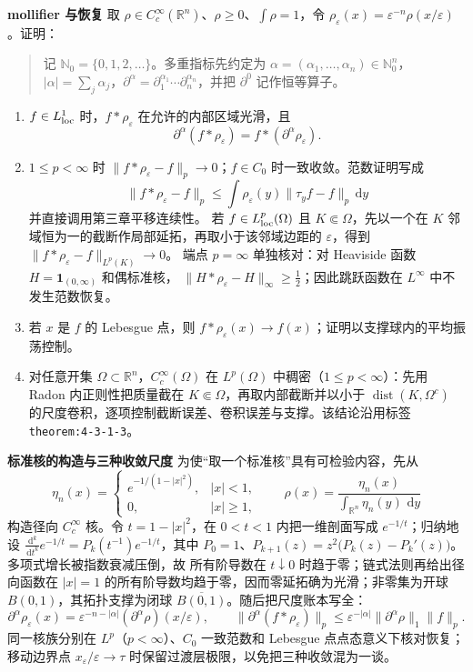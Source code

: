 \documentclass[11pt,a4paper]{ctexart}
\newcommand{\R}{\mathbb R}
\newcommand{\eps}{\varepsilon}
\newcommand{\dd}{\,\mathrm d}
\newcommand{\dist}{\operatorname{dist}}
\newcommand{\planitem}[1]{\par\smallskip\noindent\textcolor{deepblue}{\textbf{#1}}\quad}
\begin{document}
\planitem{mollifier 与恢复}
取 $\rho\in C_c^\infty(\R^n)$、$\rho\ge0$、$\int\rho=1$，令
$\rho_\eps(x)=\eps^{-n}\rho(x/\eps)$。证明：
\begin{quote}
记 $\mathbb N_0=\{0,1,2,\ldots\}$。多重指标先约定为
$\alpha=(\alpha_1,\ldots,\alpha_n)\in\mathbb N_0^n$，
$|\alpha|=\sum_j\alpha_j$，$\partial^\alpha=\partial_1^{\alpha_1}\cdots
\partial_n^{\alpha_n}$，并把 $\partial^0$ 记作恒等算子。
\end{quote}
\begin{enumerate}
\item $f\in L^1_{\rm loc}$ 时，$f*\rho_\eps$ 在允许的内部区域光滑，且
\[
\partial^\alpha(f*\rho_\eps)=f*(\partial^\alpha\rho_\eps).
\]
\item $1\le p<\infty$ 时
$\|f*\rho_\eps-f\|_p\to0$；$f\in C_0$ 时一致收敛。范数证明写成
\[
\|f*\rho_\eps-f\|_p
\le\int\rho_\eps(y)\|\tau_yf-f\|_p\dd y
\]
并直接调用第三章平移连续性。
若 $f\in L^p_{\rm loc}(\Omega)$ 且 $K\Subset\Omega$，先以一个在 $K$ 邻域恒为一的截断作局部延拓，再取小于该邻域边距的 $\eps$，得到
$\|f*\rho_\eps-f\|_{L^p(K)}\to0$。
端点 $p=\infty$ 单独核对：对 Heaviside 函数 $H=\mathbf1_{(0,\infty)}$ 和偶标准核，
$\|H*\rho_\eps-H\|_\infty\ge\tfrac12$；因此跳跃函数在 $L^\infty$ 中不发生范数恢复。
\item 若 $x$ 是 $f$ 的 Lebesgue 点，则 $f*\rho_\eps(x)\to f(x)$；证明以支撑球内的平均振荡控制。
\item 对任意开集 $\Omega\subset\R^n$，$C_c^\infty(\Omega)$ 在 $L^p(\Omega)$ 中稠密（$1\le p<\infty$）：先用 Radon 内正则性把质量截在 $K\Subset\Omega$，再取内部截断并以小于 $\dist(K,\Omega^c)$ 的尺度卷积，逐项控制截断误差、卷积误差与支撑。该结论沿用标签 \texttt{theorem:4-3-1-3}。
\end{enumerate}

\planitem{标准核的构造与三种收敛尺度}
为使“取一个标准核”具有可检验内容，先从
\[
 \eta_n(x)=\begin{cases}e^{-1/(1-|x|^2)},&|x|<1,\\0,&|x|\ge1,\end{cases}
 \qquad \rho(x)=\frac{\eta_n(x)}{\int_{\R^n}\eta_n(y)\,\dd y}
\]
构造径向 $C_c^\infty$ 核。令 $t=1-|x|^2$，在 $0<t<1$ 内把一维剖面写成
$e^{-1/t}$；归纳地设
$\frac{\dd^k}{\dd t^k}e^{-1/t}=P_k(t^{-1})e^{-1/t}$，其中
$P_0=1$、$P_{k+1}(z)=z^2\bigl(P_k(z)-P_k'(z)\bigr)$。多项式增长被指数衰减压倒，故
所有阶导数在 $t\downarrow0$ 时趋于零；链式法则再给出径向函数在 $|x|=1$ 的所有阶导数均趋于零，因而零延拓确为光滑；非零集为开球 $B(0,1)$，其拓扑支撑为闭球 $\overline{B(0,1)}$。随后把尺度账本写全：
\[
 \partial^\alpha\rho_\eps(x)=\eps^{-n-|\alpha|}(\partial^\alpha\rho)(x/\eps),
 \qquad
 \|\partial^\alpha(f*\rho_\eps)\|_p
 \le\eps^{-|\alpha|}\|\partial^\alpha\rho\|_1\|f\|_p.
\]
同一核族分别在 $L^p$（$p<\infty$）、$C_0$ 一致范数和 Lebesgue 点点态意义下核对恢复；移动边界点 $x_\eps/\eps\to\tau$ 时保留过渡层极限，以免把三种收敛混为一谈。
\end{document}
